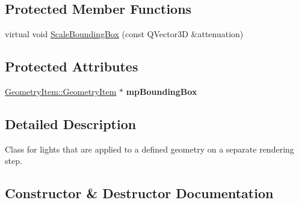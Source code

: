\subsection*{Protected Member Functions}
\begin{DoxyCompactItemize}
\item 
virtual void \mbox{\hyperlink{class_geometry_engine_1_1_geometry_world_item_1_1_geometry_light_1_1_deferred_shading_light_afeb4ce0c059042c837cc853701811be9}{Scale\+Bounding\+Box}} (const Q\+Vector3D \&attenuation)
\end{DoxyCompactItemize}
\subsection*{Protected Attributes}
\begin{DoxyCompactItemize}
\item 
\mbox{\label{class_geometry_engine_1_1_geometry_world_item_1_1_geometry_light_1_1_deferred_shading_light_a2cdd3044d2eb7ea056031b2a54070976}} 
\mbox{\hyperlink{class_geometry_engine_1_1_geometry_world_item_1_1_geometry_item_1_1_geometry_item}{Geometry\+Item\+::\+Geometry\+Item}} $\ast$ {\bfseries mp\+Bounding\+Box}
\end{DoxyCompactItemize}


\subsection{Detailed Description}
Class for lights that are applied to a defined geometry on a separate rendering step. 

\subsection{Constructor \& Destructor Documentation}
\mbox{\label{class_geometry_engine_1_1_geometry_world_item_1_1_geometry_light_1_1_deferred_shading_light_ac5d6155ce4539820a6e93a733a67fb3f}} 
